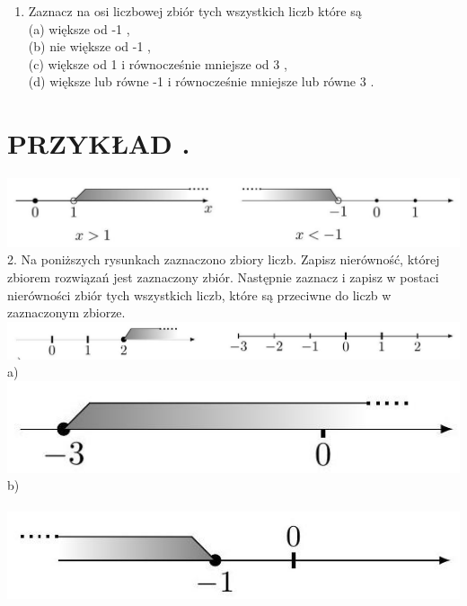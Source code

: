 \documentclass[10pt]{article}
\begin{document}
\begin{enumerate}
  \item Zaznacz na osi liczbowej zbiór tych wszystkich liczb które są\\
(a) większe od -1 ,\\
(b) nie większe od -1 ,\\
(c) większe od 1 i równocześnie mniejsze od 3 ,\\
(d) większe lub równe -1 i równocześnie mniejsze lub równe 3 .
\end{enumerate}

\section*{PRZYKŁAD .}
\includegraphics[max width=\textwidth, center]{2024_11_21_8f01584889ff06348ae7g-164(1)}\\
2. Na poniższych rysunkach zaznaczono zbiory liczb. Zapisz nierówność, której zbiorem rozwiązań jest zaznaczony zbiór. Następnie zaznacz i zapisz w postaci nierówności zbiór tych wszystkich liczb, które są przeciwne do liczb w zaznaczonym zbiorze.\\
\includegraphics[max width=\textwidth, center]{2024_11_21_8f01584889ff06348ae7g-164(5)}\\
a)\\
\includegraphics[max width=\textwidth, center]{2024_11_21_8f01584889ff06348ae7g-164(4)}\\
b)\\
\(\qquad\)\\
\includegraphics[max width=\textwidth, center]{2024_11_21_8f01584889ff06348ae7g-164}\\
\end{document}
